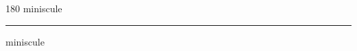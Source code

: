 
\begin{frame}
\begin{center}
\begin{turn}{180}
{\fontsize{2.5cm}{1em}\selectfont miniscule}
\end{turn}
\vspace{1em}\par  
\hrule
\vspace{1em}\par  
{\fontsize{2.5cm}{1em}\selectfont miniscule}
\end{center}
\end{frame}
